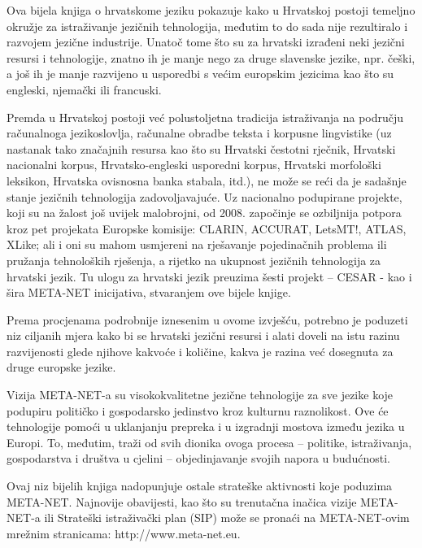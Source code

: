 \begin{multicols}{2}
Ova bijela knjiga o hrvatskome jeziku pokazuje kako u Hrvatskoj postoji temeljno okružje za istraživanje jezičnih tehnologija, međutim to do sada nije rezultiralo i razvojem jezične industrije. Unatoč tome što su za hrvatski izrađeni neki jezični resursi i tehnologije, znatno ih je manje nego za druge slavenske jezike, npr. češki, a još ih je manje razvijeno u usporedbi s većim europskim jezicima kao što su engleski, njemački ili francuski. 

Premda u Hrvatskoj postoji već polustoljetna tradicija istraživanja na području računalnoga jezikoslovlja, računalne obradbe teksta i korpusne lingvistike (uz nastanak tako značajnih resursa kao što su Hrvatski čestotni rječnik, Hrvatski nacionalni korpus, Hrvatsko-engleski usporedni korpus, Hrvatski morfološki leksikon, Hrvatska ovisnosna banka stabala, itd.), ne može se reći da je sadašnje stanje jezičnih tehnologija zadovoljavajuće. Uz nacionalno podupirane projekte, koji su na žalost još uvijek malobrojni, od 2008. započinje se ozbiljnija potpora kroz pet projekata Europske komisije: CLARIN, ACCURAT, LetsMT!, ATLAS, XLike; ali i oni su mahom usmjereni na rješavanje pojedinačnih problema ili pružanja tehnoloških rješenja, a rijetko na ukupnost jezičnih tehnologija za hrvatski jezik. Tu ulogu za hrvatski jezik preuzima šesti projekt -- CESAR - kao i šira META-NET inicijativa, stvaranjem ove bijele knjige.

Prema procjenama podrobnije iznesenim u ovome izvješću, potrebno je poduzeti niz ciljanih mjera kako bi se hrvatski jezični resursi i alati doveli na istu razinu razvijenosti glede njihove kakvoće i količine, kakva je razina već dosegnuta za druge europske jezike.

Vizija META-NET-a su visokokvalitetne jezične tehnologije za sve jezike koje podupiru političko i gospodarsko jedinstvo kroz kulturnu raznolikost. Ove će tehnologije pomoći u uklanjanju prepreka i u izgradnji mostova između jezika u Europi. To, međutim, traži od svih dionika ovoga procesa – politike, istraživanja, gospodarstva i društva u cjelini – objedinjavanje svojih napora u budućnosti.

Ovaj niz bijelih knjiga nadopunjuje ostale strateške aktivnosti koje poduzima META-NET. Najnovije obavijesti, kao što su trenutačna inačica vizije META-NET-a \cite{str1} ili Strateški istraživački plan (SIP) može se pronaći na META-NET-ovim mrežnim stranicama: http://www.meta-net.eu.

\end{multicols}

